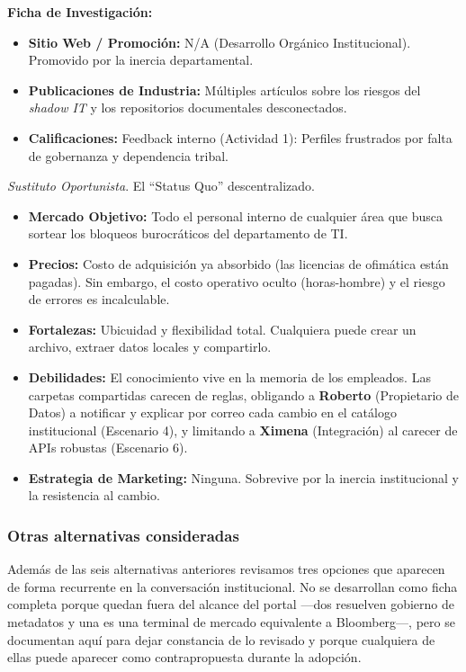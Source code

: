 \textbf{Ficha de Investigación:}
\begin{itemize}
    \item \textbf{Sitio Web / Promoción:} N/A (Desarrollo Orgánico Institucional). Promovido por la inercia departamental.
    \item \textbf{Publicaciones de Industria:} Múltiples artículos sobre los riesgos del \textit{shadow IT} y los repositorios documentales desconectados.
    \item \textbf{Calificaciones:} Feedback interno (Actividad 1): Perfiles frustrados por falta de gobernanza y dependencia tribal.
\end{itemize}
\vspace{0.35cm}

\textit{Sustituto Oportunista}. El ``Status Quo'' descentralizado.
\begin{itemize}
    \item \textbf{Mercado Objetivo:} Todo el personal interno de cualquier área que busca sortear los bloqueos burocráticos del departamento de TI.
    \item \textbf{Precios:} Costo de adquisición ya absorbido (las licencias de ofimática están pagadas). Sin embargo, el costo operativo oculto (horas-hombre) y el riesgo de errores es incalculable.
    \item \textbf{Fortalezas:} Ubicuidad y flexibilidad total. Cualquiera puede crear un archivo, extraer datos locales y compartirlo.
    \item \textbf{Debilidades:} El conocimiento vive en la memoria de los empleados. Las carpetas compartidas carecen de reglas, obligando a \textbf{Roberto} (Propietario de Datos) a notificar y explicar por correo cada cambio en el catálogo institucional (Escenario 4), y limitando a \textbf{Ximena} (Integración) al carecer de APIs robustas (Escenario 6).
    \item \textbf{Estrategia de Marketing:} Ninguna. Sobrevive por la inercia institucional y la resistencia al cambio.
\end{itemize}

\clearpage
\subsubsection{Otras alternativas consideradas}

Además de las seis alternativas anteriores revisamos tres opciones que aparecen de forma recurrente en la conversación institucional. No se desarrollan como ficha completa porque quedan fuera del alcance del portal —dos resuelven gobierno de metadatos y una es una terminal de mercado equivalente a Bloomberg—, pero se documentan aquí para dejar constancia de lo revisado y porque cualquiera de ellas puede aparecer como contrapropuesta durante la adopción.


